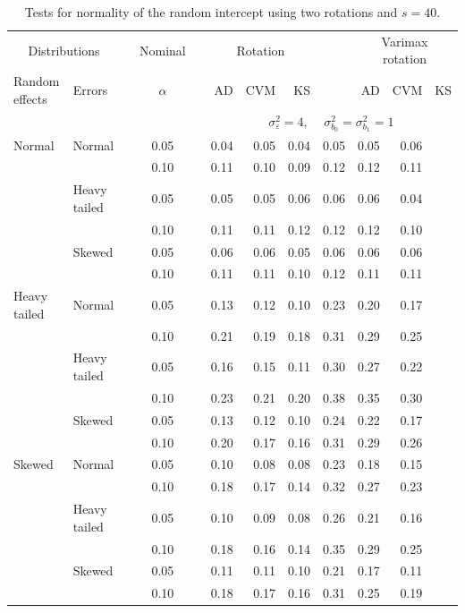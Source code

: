 \documentclass[12pt]{article} %
\begin{document}
\begin{table}[ht]
\caption{Tests for normality of the random intercept using two rotations and $s = 40$.}
\begin{scriptsize}
\begin{center}
\begin{tabular}{ll p{.1cm} c p{.1cm} rrr p{.1cm} rrr}
  \hline
  \multicolumn{2}{c}{Distributions}& & Nominal & &  \multicolumn{3}{c}{Rotation} & & \multicolumn{3}{c}{Varimax rotation} \\ \cline{1-2} \cline{6-8} \cline{10-12}   
  Random effects & Errors & & $\alpha$ & & AD & CVM & KS & & AD & CVM & KS \\ 
   \hline
& && && \multicolumn{7}{c}{$\sigma_{\varepsilon}^2 = 4$, \ \ $\sigma_{b_0}^2 = \sigma_{b_1}^2 = 1$} \\ \cline{6-12}
Normal       & Normal       && 0.05 &&   0.04 & 0.05 & 0.04 & 0.05 & 0.05 & 0.06 \\ 
             &              && 0.10 &&   0.11 & 0.10 & 0.09 & 0.12 & 0.12 & 0.11 \\ 
             & Heavy tailed && 0.05 &&   0.05 & 0.05 & 0.06 & 0.06 & 0.06 & 0.04 \\ 
             &              && 0.10 &&   0.11 & 0.11 & 0.12 & 0.12 & 0.12 & 0.10 \\ 
             & Skewed       && 0.05 &&   0.06 & 0.06 & 0.05 & 0.06 & 0.06 & 0.06 \\ 
             &              && 0.10 &&   0.11 & 0.11 & 0.10 & 0.12 & 0.11 & 0.11 \\ 
Heavy tailed & Normal       && 0.05 &&   0.13 & 0.12 & 0.10 & 0.23 & 0.20 & 0.17 \\ 
             &              && 0.10 &&   0.21 & 0.19 & 0.18 & 0.31 & 0.29 & 0.25 \\ 
             & Heavy tailed && 0.05 &&   0.16 & 0.15 & 0.11 & 0.30 & 0.27 & 0.22 \\ 
             &              && 0.10 &&   0.23 & 0.21 & 0.20 & 0.38 & 0.35 & 0.30 \\ 
             & Skewed       && 0.05 &&   0.13 & 0.12 & 0.10 & 0.24 & 0.22 & 0.17 \\ 
             &              && 0.10 &&   0.20 & 0.17 & 0.16 & 0.31 & 0.29 & 0.26 \\ 
Skewed       & Normal       && 0.05 &&   0.10 & 0.08 & 0.08 & 0.23 & 0.18 & 0.15 \\ 
             &              && 0.10 &&   0.18 & 0.17 & 0.14 & 0.32 & 0.27 & 0.23 \\ 
             & Heavy tailed && 0.05 &&   0.10 & 0.09 & 0.08 & 0.26 & 0.21 & 0.16 \\ 
             &              && 0.10 &&   0.18 & 0.16 & 0.14 & 0.35 & 0.29 & 0.25 \\ 
             & Skewed       && 0.05 &&   0.11 & 0.11 & 0.10 & 0.21 & 0.17 & 0.11 \\ 
             &              && 0.10 &&   0.18 & 0.17 & 0.16 & 0.31 & 0.25 & 0.19 \\ 


\end{tabular}
\end{center}
\end{scriptsize}
\end{table}
\end{document}

